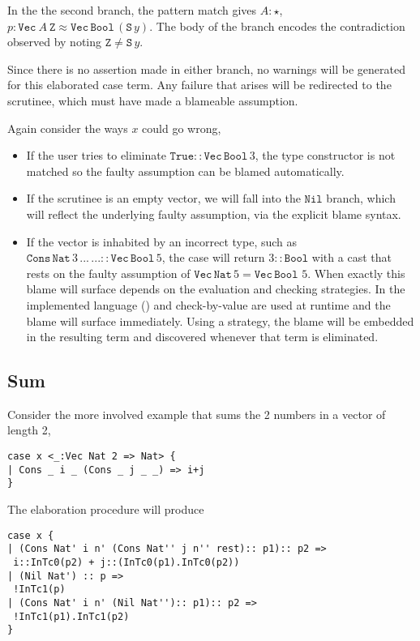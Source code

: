In the the second branch, the pattern match gives $A:\star$, $p:\mathtt{Vec}\ A\ \mathtt{Z}\approx\mathtt{Vec}\,\mathtt{Bool}\,(\mathtt{S}\,y)$.
The body of the branch encodes the contradiction observed by noting $\mathtt{Z}\neq\mathtt{S}\,y$.
 
Since there is no assertion made in either branch, no warnings will be generated for this elaborated case term.
Any failure that arises will be redirected to the scrutinee, which must have made a blameable assumption.
 
Again consider the ways $x$ could go wrong,
\begin{itemize}
\item
If the user tries to eliminate $\mathtt{True}::\mathtt{Vec}\,\mathtt{Bool}\,3$, the type constructor is not matched so the faulty assumption can be blamed automatically.
\item
If the scrutinee is an empty vector, we will fall into the $\mathtt{Nil}$ branch, which will reflect the underlying faulty assumption, via the explicit blame syntax.
\item
If the vector is inhabited by an incorrect type, such as $\mathtt{Cons}\,\mathtt{Nat}\,3\,...\,...::\mathtt{Vec}\,\mathtt{Bool}\,5$, the case will return $3::\mathtt{Bool}$ with a cast that rests on the faulty assumption of $\mathtt{Vec}\,\mathtt{Nat}\,5=\mathtt{Vec}\,\mathtt{Bool}\,\,5$.
When exactly this blame will surface depends on the evaluation and checking strategies.
In the implemented language \cbv() and check-by-value are used at runtime and the blame will surface immediately.
Using a \whnf{} strategy, the blame will be embedded in the resulting term and discovered whenever that term is eliminated.
\end{itemize}
 
\subsection{Sum}
 
Consider the more involved example that sums the 2 numbers in a vector of length 2,
 
\begin{lstlisting}[basicstyle={\ttfamily\small}]
case x <_:Vec Nat 2 => Nat> {
| Cons _ i _ (Cons _ j _ _) => i+j
}
\end{lstlisting}
 
The elaboration procedure will produce
 
\begin{lstlisting}[basicstyle={\ttfamily\small}]
case x {
| (Cons Nat' i n' (Cons Nat'' j n'' rest):: p1):: p2 =>
 i::InTc0(p2) + j::(InTc0(p1).InTc0(p2))
| (Nil Nat') :: p =>
 !InTc1(p)
| (Cons Nat' i n' (Nil Nat''):: p1):: p2 =>
 !InTc1(p1).InTc1(p2)
}
\end{lstlisting}
 
